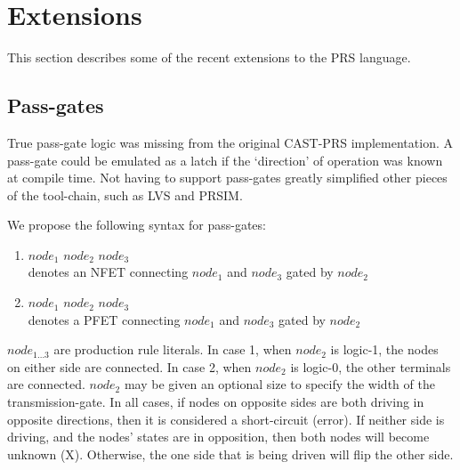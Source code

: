 \section{Extensions}
\label{sec:prs:ext}

This section describes some of the recent extensions to the PRS language.  

\subsection{Pass-gates}
\label{sec:prs:ext:passgates}

True pass-gate logic was missing from the original CAST-PRS implementation.  
A pass-gate could be emulated as a latch if the `direction' of operation was
known at compile time.  
Not having to support pass-gates greatly simplified other pieces of the 
tool-chain, such as LVS and PRSIM.  

We propose the following syntax for pass-gates:

\begin{enumerate}
\item $node_1$ \ttt{<-} $node_2$ \ttt{->} $node_3$\\
	denotes an NFET connecting $node_1$ and $node_3$ gated by $node_2$
\item $node_1$ \ttt{<+} $node_2$ \ttt{+>} $node_3$\\
	denotes a PFET connecting $node_1$ and $node_3$ gated by $node_2$
\end{enumerate}

$node_{1...3}$ are production rule literals.  
In case 1, when $node_2$ is logic-1, the nodes on either side are connected.
In case 2, when $node_2$ is logic-0, the other terminals are connected.  
$node_2$ may be given an optional size to specify the 
width of the transmission-gate.  
In all cases, 
if nodes on opposite sides are both driving in opposite directions, 
then it is considered a short-circuit (error).  
If neither side is driving, and the nodes' states are in opposition, 
then both nodes will become unknown (X). 
Otherwise, the one side that is being driven will flip the other side.  

